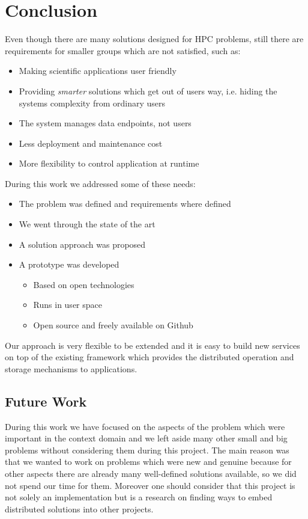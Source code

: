 \chapter{Conclusion}
\label{cha:conclusion}

Even though there are many solutions designed for HPC problems, still there are requirements for smaller groups which are not satisfied, such as:
\begin{itemize}
\item Making scientific applications user friendly 
\item Providing \textit{smarter} solutions which get out of users way, i.e. hiding the systems complexity from ordinary users
\item The system manages data endpoints, not users
\item Less deployment and maintenance cost
\item More flexibility to control application at runtime
\end{itemize}
During this work we addressed some of these needs:
\begin{itemize}
\item The problem was defined and requirements where defined
\item We went through the state of the art
\item A solution approach was proposed
\item A prototype was developed
\begin{itemize}
\fontsize{30pt}{31}\selectfont
\item Based on open technologies
\item Runs in user space
\item Open source and freely available on Github
\end{itemize}
\end{itemize}
Our approach is very flexible to be extended and it is easy to build new services on top of the existing framework 
which provides the distributed operation and storage mechanisms to applications.

\section{Future Work}
During this work we have focused on the aspects of the problem which were important in the context 
domain and we left aside many other small and big problems without considering them during this project. The main
reason was that we wanted to work on problems which were new and genuine
because for other aspects there are already many well-defined solutions
available, so we did not spend our time for them. Moreover one should 
consider that this project is not solely an implementation but is a 
research on finding ways to embed distributed solutions into other projects.


